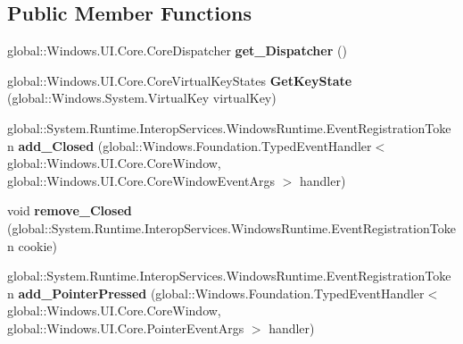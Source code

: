 \subsection*{Public Member Functions}
\begin{DoxyCompactItemize}
\item 
\mbox{\label{class_windows_1_1_u_i_1_1_core_1_1_core_window_a4782a27adee4d380d23689281fc88557}} 
global\+::\+Windows.\+U\+I.\+Core.\+Core\+Dispatcher {\bfseries get\+\_\+\+Dispatcher} ()
\item 
\mbox{\label{class_windows_1_1_u_i_1_1_core_1_1_core_window_ade3fe1967e403778223e3236e0c503f3}} 
global\+::\+Windows.\+U\+I.\+Core.\+Core\+Virtual\+Key\+States {\bfseries Get\+Key\+State} (global\+::\+Windows.\+System.\+Virtual\+Key virtual\+Key)
\item 
\mbox{\label{class_windows_1_1_u_i_1_1_core_1_1_core_window_a961d684ac08b8daaba0ae932995c1a06}} 
global\+::\+System.\+Runtime.\+Interop\+Services.\+Windows\+Runtime.\+Event\+Registration\+Token {\bfseries add\+\_\+\+Closed} (global\+::\+Windows.\+Foundation.\+Typed\+Event\+Handler$<$ global\+::\+Windows.\+U\+I.\+Core.\+Core\+Window, global\+::\+Windows.\+U\+I.\+Core.\+Core\+Window\+Event\+Args $>$ handler)
\item 
\mbox{\label{class_windows_1_1_u_i_1_1_core_1_1_core_window_aa0cf80ef7200e08c7924a163be3833cf}} 
void {\bfseries remove\+\_\+\+Closed} (global\+::\+System.\+Runtime.\+Interop\+Services.\+Windows\+Runtime.\+Event\+Registration\+Token cookie)
\item 
\mbox{\label{class_windows_1_1_u_i_1_1_core_1_1_core_window_a40ea0111f6284c33ba8550a4473ce2cd}} 
global\+::\+System.\+Runtime.\+Interop\+Services.\+Windows\+Runtime.\+Event\+Registration\+Token {\bfseries add\+\_\+\+Pointer\+Pressed} (global\+::\+Windows.\+Foundation.\+Typed\+Event\+Handler$<$ global\+::\+Windows.\+U\+I.\+Core.\+Core\+Window, global\+::\+Windows.\+U\+I.\+Core.\+Pointer\+Event\+Args $>$ handler)
\item 
\mbox{\label{class_windows_1_1_u_i_1_1_core_1_1_core_window_a96f250810201c484ac490b1bcc7659cf}} 

\end{DoxyCompactItemize}
